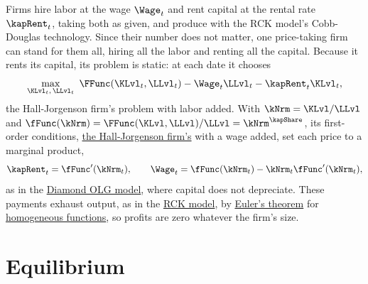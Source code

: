 \documentclass{econark}
\begin{document}
Firms hire labor at the wage $\Wage_{t}$ and rent capital at the rental rate $\kapRent_{t}$, taking both as given, and produce with the RCK model's Cobb-Douglas technology. Since their number does not matter, one price-taking firm can stand for them all, hiring all the labor and renting all the capital. Because it rents its capital, its problem is static: at each date it chooses
\begin{equation*}
  \max_{\KLvl_{t},\,\LLvl_{t}}\ \FFunc(\KLvl_{t},\LLvl_{t}) - \Wage_{t}\LLvl_{t} - \kapRent_{t}\KLvl_{t},
\end{equation*}
the Hall-Jorgenson firm's problem with labor added. With $\kNrm = \KLvl/\LLvl$ and $\fFunc(\kNrm) = \FFunc(\KLvl,\LLvl)/\LLvl = \kNrm^{\kapShare}$, its first-order conditions, \href{https://intertemporal-choice.github.io/content/investment/halljorgenson/\#eq-khj}{the Hall-Jorgenson firm's} with a wage added, set each price to a marginal product,
\begin{equation}
  \kapRent_{t} = \fFunc^{\prime}(\kNrm_{t}), \qquad \Wage_{t} = \fFunc(\kNrm_{t}) - \kNrm_{t}\fFunc^{\prime}(\kNrm_{t}), \label{eq:DecRCK-prices}
\end{equation}
as in the \href{https://intertemporal-choice.github.io/content/consumption/olgmodel/\#eq-reqfp}{Diamond OLG model}, where capital does not depreciate. These payments exhaust output, as in the \href{https://intertemporal-choice.github.io/content/growth/ramseycasskoopmans/\#eq-rck-outputexhausted}{RCK model}, by \href{https://intertemporal-choice.github.io/content/appendices/mathematical/mathfactslist/\#fact-eulerstheorem}{Euler's theorem} for \href{https://en.wikipedia.org/wiki/Homogeneous_function\#Euler's_theorem}{homogeneous functions}, so profits are zero whatever the firm's size.

\section{Equilibrium}
\end{document}
